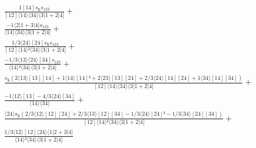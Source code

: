\documentclass[varwidth, border=5pt]{standalone}
\begin{document}
\begin{my}
$\begin{gathered}
\scriptscriptstyle\frac{1[14]s_{𝟓}s_{123}}{[12]⟨14⟩⟨34⟩⟨3|1+2|4]} +\\
\scriptscriptstyle\frac{-1⟨2|1+3|4]s_{123}}{⟨14⟩⟨34⟩⟨3|1+2|4]} +\\
\scriptscriptstyle\frac{1/3⟨24⟩[24]s_{𝟓}s_{123}}{[12]⟨14⟩²⟨34⟩⟨3|1+2|4]} +\\
\scriptscriptstyle\frac{-1/3⟨13⟩⟨24⟩[34]s_{123}}{⟨14⟩²⟨34⟩⟨3|1+2|4]} +\\
\scriptscriptstyle\frac{s_{𝟓}(2⟨13⟩[13][14]+1⟨14⟩[14]²+2⟨23⟩[13][24]+2/3⟨24⟩[14][24]+1⟨34⟩[14][34])}{[12]⟨14⟩⟨34⟩⟨3|1+2|4]} +\\
\scriptscriptstyle\frac{-1⟨12⟩[13]-4/3⟨24⟩[34]}{⟨14⟩⟨34⟩} +\\
\scriptscriptstyle\frac{⟨24⟩s_{𝟓}(2/3⟨12⟩[12][24]+2/3⟨13⟩[12][34]-1/3⟨24⟩[24]²-1/3⟨34⟩[24][34])}{[12]⟨14⟩²⟨34⟩⟨3|1+2|4]} +\\
\scriptscriptstyle\frac{1/3⟨12⟩[12]⟨24⟩⟨1|2+3|4]}{⟨14⟩²⟨34⟩⟨3|1+2|4]} \phantom{+}
\end{gathered}$
\end{my}
\end{document}
